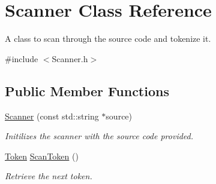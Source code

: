 \hypertarget{class_scanner}{}\section{Scanner Class Reference}
\label{class_scanner}


A class to scan through the source code and tokenize it.  




{\ttfamily \#include $<$Scanner.\+h$>$}

\subsection*{Public Member Functions}
\begin{DoxyCompactItemize}
\item 
\mbox{\label{class_scanner_abccccf14f4b755fe2c0d3d6d4e52616a}} 
\hyperlink{class_scanner_abccccf14f4b755fe2c0d3d6d4e52616a}{Scanner} (const std\+::string $\ast$source)
\begin{DoxyCompactList}\small\item\em Initilizes the scanner with the source code provided. \end{DoxyCompactList}\item 
\hyperlink{struct_token}{Token} \hyperlink{class_scanner_ae576450fd0cbbe93dd00b7a1acfaae8b}{Scan\+Token} ()
\begin{DoxyCompactList}\small\item\em Retrieve the next token. \end{DoxyCompactList}\end{DoxyCompactItemize}
